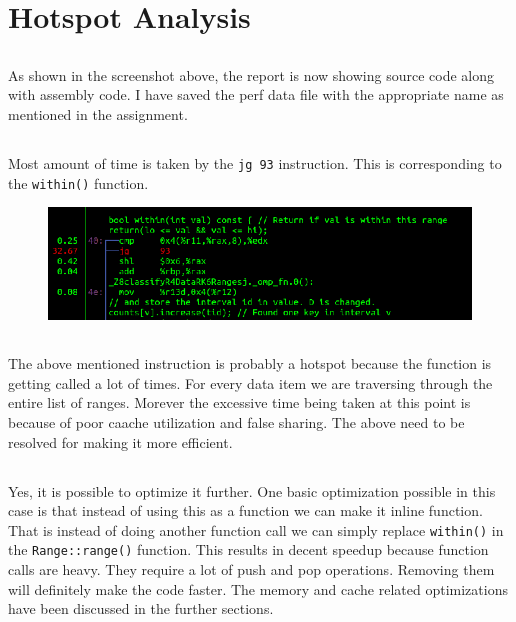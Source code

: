 \documentclass{article}
\begin{document}
\section{Hotspot Analysis}
\subsection{}
As shown in the screenshot above, the report is now showing source code along with assembly code. I have saved the perf data file with the appropriate name as mentioned in the assignment.

\subsection{}
Most amount of time is taken by the \texttt{jg 93} instruction. This is corresponding to the \texttt{within()} function.
\begin{figure}[H]
\centering  
\includegraphics[width=1\textwidth]{images/hotspot.png}
\end{figure}

\subsection{}
The above mentioned instruction is probably a hotspot because the function is getting called a lot of times. For every data item we are traversing through the entire list of ranges. Morever the excessive time being taken at this point is because of poor caache utilization and false sharing. The above need to be resolved for making it more efficient.

\subsection{}
Yes, it is possible to optimize it further. One basic optimization possible in this case is that instead of using this as a function we can make it inline function. That is instead of doing another function call we can simply replace \texttt{within()} in the \texttt{Range::range()} function. This results in decent speedup because function calls are heavy. They require a lot of push and pop operations. Removing them will definitely make the code faster. The memory and cache related optimizations have been discussed in the further sections.
\end{document}
